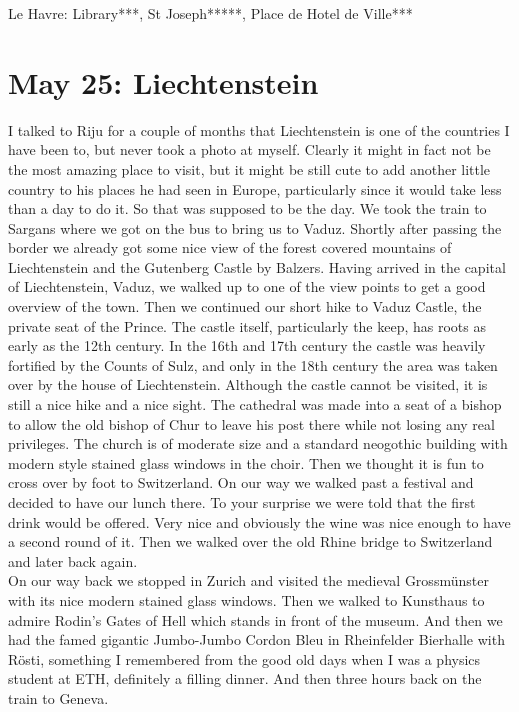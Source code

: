 Le Havre: Library***, St Joseph*****, Place de Hotel de Ville***

\section{May 25: Liechtenstein}
\label{2019Liechtenstein}

I talked to Riju for a couple of months that Liechtenstein is one of the countries I have been to, but never took a photo at myself. Clearly it might in fact not be the most amazing place to visit, but it might be still cute to add another little country to his places he had seen in Europe, particularly since it would take less than a day to do it. So that was supposed to be the day. We took the train to Sargans where we got on the bus to bring us to Vaduz. Shortly after passing the border we already got some nice view of the forest covered mountains of Liechtenstein and the Gutenberg Castle by Balzers. Having arrived in the capital of Liechtenstein, Vaduz, we walked up to one of the view points to get a good overview of the town. Then we continued our short hike to Vaduz Castle, the private seat of the Prince. The castle itself, particularly the keep, has roots as early as the 12th century. In the 16th and 17th century the castle was heavily fortified by the Counts of Sulz, and only in the 18th century the area was taken over by the house of Liechtenstein. Although the castle cannot be visited, it is still a nice hike and a nice sight. The cathedral was made into a seat of a bishop to allow the old bishop of Chur to leave his post there while not losing any real privileges. The church is of moderate size and a standard neogothic building with modern style stained glass windows in the choir. Then we thought it is fun to cross over by foot to Switzerland. On our way we walked past a festival and decided to have our lunch there. To your surprise we were told that the first drink would be offered. Very nice and obviously the wine was nice enough to have a second round of it. Then we walked over the old Rhine bridge to Switzerland and later back again. \\
On our way back we stopped in Zurich and visited the medieval Grossm\"unster with its nice modern stained glass windows. Then we walked to Kunsthaus to admire Rodin's Gates of Hell which stands in front of the museum. And then we had the famed gigantic Jumbo-Jumbo Cordon Bleu in Rheinfelder Bierhalle with R\"osti, something I remembered from the good old days when I was a physics student at ETH, definitely a filling dinner. And then three hours back on the train to Geneva.\\

